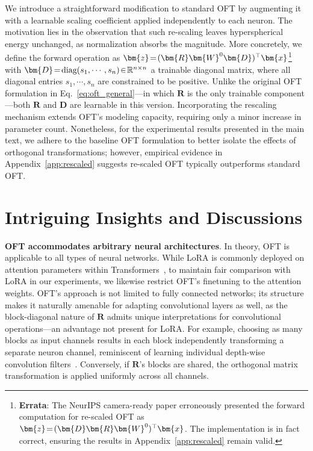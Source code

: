 We introduce a straightforward modification to standard OFT by augmenting it with a learnable scaling coefficient applied independently to each neuron. The motivation lies in the observation that such re-scaling leaves hyperspherical energy unchanged, as normalization absorbs the magnitude. More concretely, we define the forward operation as $\thickmuskip=2mu \medmuskip=2mu\bm{z}=(\bm{R}\bm{W}^0\bm{D})^\top\bm{x}$\footnote{\textbf{Errata}: The NeurIPS camera-ready paper erroneously presented the forward computation for re-scaled OFT as $\thickmuskip=2mu \medmuskip=2mu\bm{z}=(\bm{D}\bm{R}\bm{W}^0)^\top\bm{x}$. The implementation is in fact correct, ensuring the results in Appendix~\ref{app:rescaled} remain valid.} with $\thickmuskip=2mu \medmuskip=2mu \bm{D}=\text{diag}(s_1,\cdots,s_n)\in\mathbb{R}^{n\times n}$ a trainable diagonal matrix, where all diagonal entries $s_1,\cdots,s_n$ are constrained to be positive. Unlike the original OFT formulation in Eq.~\eqref{eq:oft_general}—in which $\bm{R}$ is the only trainable component—both $\bm{R}$ and $\bm{D}$ are learnable in this version. Incorporating the rescaling mechanism extends OFT’s modeling capacity, requiring only a minor increase in parameter count. Nonetheless, for the experimental results presented in the main text, we adhere to the baseline OFT formulation to better isolate the effects of orthogonal transformations; however, empirical evidence in Appendix~\ref{app:rescaled} suggests re-scaled OFT typically outperforms standard OFT.

\section{Intriguing Insights and Discussions}

\textbf{OFT accommodates arbitrary neural architectures}. In theory, OFT is applicable to all types of neural networks. While LoRA is commonly deployed on attention parameters within Transformers~\cite{hulora2022}, to maintain fair comparison with LoRA in our experiments, we likewise restrict OFT’s finetuning to the attention weights. OFT’s approach is not limited to fully connected networks; its structure makes it naturally amenable for adapting convolutional layers as well, as the block-diagonal nature of $\bm{R}$ admits unique interpretations for convolutional operations—an advantage not present for LoRA. For example, choosing as many blocks as input channels results in each block independently transforming a separate neuron channel, reminiscent of learning individual depth-wise convolution filters~\cite{chollet2017xception}. Conversely, if $\bm{R}$'s blocks are shared, the orthogonal matrix transformation is applied uniformly across all channels.


